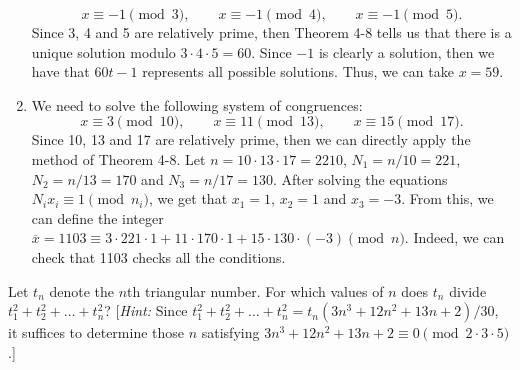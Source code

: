 \begin{solution}
\begin{enumerate}
        $$x \equiv -1 \pmod{3}, \qquad x \equiv -1 \pmod{4}, \qquad x\equiv -1 \pmod 5.$$
        Since 3, 4 and 5 are relatively prime, then Theorem 4-8 tells us that there is a unique solution modulo $3 \cdot 4 \cdot 5 = 60$. Since $-1$ is clearly a solution, then we have that $60t - 1$ represents all possible solutions. Thus, we can take $x = 59$.
        \item We need to solve the following system of congruences:
        $$x \equiv 3 \pmod{10}, \qquad x \equiv 11 \pmod{13}, \qquad x\equiv 15 \pmod{17}.$$
        Since 10, 13 and 17 are relatively prime, then we can directly apply the method of Theorem 4-8. Let $n = 10 \cdot 13 \cdot 17 = 2210$, $N_1 = n / 10 = 221$, $N_2 = n / 13 = 170$ and $N_3 = n / 17 = 130$. After solving the equations $N_i x_i \equiv 1 \pmod{n_i}$, we get that $x_1 = 1$, $x_2 = 1$ and $x_3 = -3$. From this, we can define the integer $\overline{x} = 1103 \equiv 3 \cdot 221 \cdot 1 + 11 \cdot 170 \cdot 1 + 15 \cdot 130 \cdot (-3) \pmod n$. Indeed, we can check that 1103 checks all the conditions. \\
    \end{enumerate}
\end{solution} 

\begin{exercise}
    Let $t_n$ denote the $n$th triangular number. For which values of $n$ does $t_n$ divide $t_1^2 + t_2^2 + \dots + t_n^2$? [\textit{Hint:} Since $t_1^2 + t_2^2 + \dots + t_n^2 = t_n(3n^3 + 12n^2 + 13n + 2)/30$, it suffices to determine those $n$ satisfying $3n^3 + 12n^2 + 13n + 2 \equiv 0 \pmod{2 \cdot 3 \cdot 5}$.]\\
\end{exercise}

